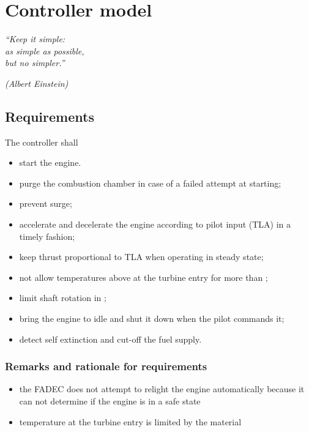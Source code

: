 \documentclass[tcc]{subfiles}
\begin{document}
\chapter{Controller model}
\label{ch:control}
\epigraph{\em ``Keep it simple:\\
as simple as possible,\\
but no simpler.''}{\em (Albert Einstein)}

\section{Requirements}
The controller shall
\begin{itemize}
    \item start the engine.
    \item purge the combustion chamber in case of a failed attempt at starting;
    \item prevent surge;
    \item accelerate and decelerate the engine according to pilot input (\acs{TLA}) in a timely fashion;
    \item keep thrust proportional to \gls{TLA} when operating in steady state;
    \item not allow temperatures above  at the turbine entry for more than ;
    \item limit shaft rotation in ;
    \item bring the engine to idle and shut it down when the pilot commands it;
    \item detect self extinction and cut-off the fuel supply.
\end{itemize}

\subsection{Remarks and rationale for requirements}
\begin{itemize}
    \item the \gls{FADEC} does not attempt to relight the engine automatically 
          because it can not determine if the engine is in a safe state
    \item temperature at the turbine entry is limited by the material 
\end{itemize}
\end{document}
